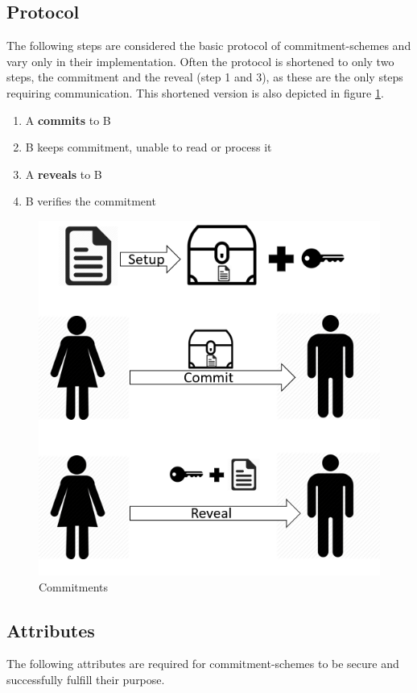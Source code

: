 \subsection{Protocol}
The following steps are considered the basic protocol of commitment-schemes and vary only in their implementation. Often the protocol is shortened to only two steps, the commitment and the reveal (step 1 and 3), as these are the only steps requiring communication. This shortened version is also depicted in figure \ref{fig:protocoll}.  
\begin{enumerate}
	\item A \textbf{commits} to B
	\item B keeps commitment, unable to read or process it
	\item A \textbf{reveals} to B
	\item B verifies the commitment 
\end{enumerate}

\begin{figure}
	\centering
	\includegraphics[width=0.8\linewidth]{Images/protocoll}
	\caption[Commitments]{Commitments}
	\label{fig:protocoll}
\end{figure}

\subsection{Attributes}
The following attributes are required for commitment-schemes to be secure and successfully fulfill their purpose.

